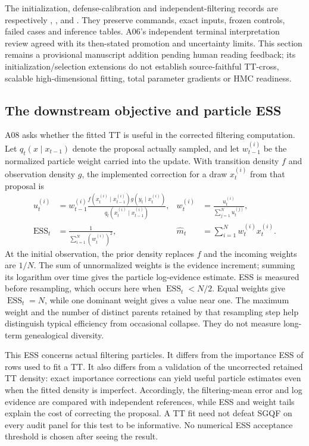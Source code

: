 \documentclass[11pt]{article}
\DeclareMathOperator{\ESS}{ESS}
\begin{document}
The initialization, defense-calibration and independent-filtering records are
respectively
,
, and
.
They preserve commands, exact inputs, frozen controls, failed cases and
inference tables. A06's independent terminal interpretation review agreed with
its then-stated promotion and uncertainty limits. This section remains a
provisional manuscript addition pending human reading feedback; its
initialization/selection extensions do not establish source-faithful TT-cross,
scalable high-dimensional fitting, total parameter gradients or HMC readiness.

\subsection{The downstream objective and particle ESS}
\label{sec:tt-downstream-objective}

A08 asks whether the fitted TT is useful in the corrected filtering computation.
Let $q_t(x\mid x_{t-1})$ denote the proposal actually sampled, and let
$w_{t-1}^{(i)}$ be the normalized particle weight carried into the update.
With transition density $f$ and observation density $g$, the implemented
correction for a draw $x_t^{(i)}$ from that proposal is
\begin{align}
 u_t^{(i)} & = w_{t-1}^{(i)}
 \frac{f(x_t^{(i)}\mid x_{t-1}^{(i)})g(y_t\mid x_t^{(i)})}
 {q_t(x_t^{(i)}\mid x_{t-1}^{(i)})},
 & w_t^{(i)}&=\frac{u_t^{(i)}}{\sum_{j=1}^N u_t^{(j)}},\\
 \ESS_t&=\frac{1}{\sum_{i=1}^N(w_t^{(i)})^2},
 &\widehat m_t&=\sum_{i=1}^N w_t^{(i)}x_t^{(i)}.
\end{align}
At the initial observation, the prior density replaces $f$ and the incoming
weights are $1/N$. The sum of unnormalized weights is the evidence increment;
summing its logarithm over time gives the particle log-evidence estimate.
ESS is measured before resampling, which occurs here when $\ESS_t<N/2$.
Equal weights give $\ESS_t=N$, while one dominant weight gives a value near
one. The maximum weight and the number of distinct parents retained by that
resampling step help distinguish typical efficiency from occasional collapse.
They do not measure long-term genealogical diversity.

This ESS concerns actual filtering particles. It differs from the importance
ESS of rows used to fit a TT. It also differs from a validation of the
uncorrected retained TT density: exact importance corrections can yield useful
particle estimates even when the fitted density is imperfect. Accordingly,
the filtering-mean error and log evidence are compared with independent
references, while ESS and weight tails explain the cost of correcting the
proposal. A TT fit need not defeat SGQF on every audit panel for this test to
be informative. No numerical ESS acceptance threshold is chosen after seeing
the result.
\end{document}
